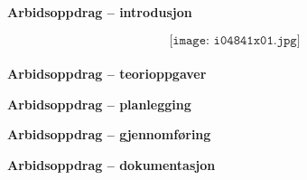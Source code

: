 

\noindent

\vskip 5pt


\textbf{Arbidsoppdrag -- introdusjon}

$$\texttt{[image: i04841x01.jpg]}$$\\
\textbf{Arbidsoppdrag -- teorioppgaver}

\textbf{Arbidsoppdrag -- planlegging}

\textbf{Arbidsoppdrag -- gjennomføring}

\textbf{Arbidsoppdrag -- dokumentasjon}








\vfil \eject

















